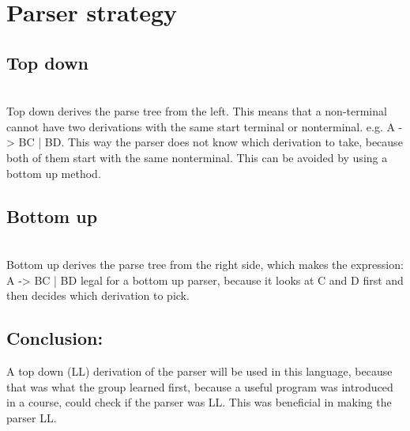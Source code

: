 \section{Parser strategy}
\subsection*{Top down} \\
Top down derives the parse tree from the left. This means that a non-terminal cannot have two derivations with the same start terminal or nonterminal. e.g. A -> BC | BD. This way the parser does not know which derivation to take, because both of them start with the same nonterminal.
This can be avoided by using a bottom up method.


\subsection*{Bottom up} \\
Bottom up derives the parse tree from the right side, which makes the expression: A -> BC | BD legal for a bottom up parser, because it looks at C and D first and then decides which derivation to pick.


\subsection*{Conclusion:}
A top down (LL) derivation of the parser will be used in this language, because that was what the group learned first, because a useful program was introduced in a course, could check if the parser was LL. This was beneficial in making the parser LL.

